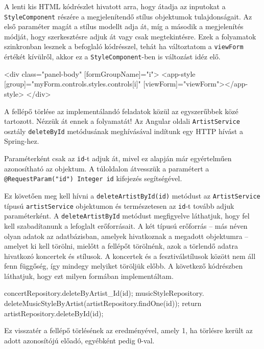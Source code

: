 A lenti kis HTML kódrészlet hivatott arra, hogy átadja az inputokat a \texttt{StyleComponent} részére a megjelenítendő stílus objektumok tulajdonságait. Az első paraméter magát a stílus modellt adja át, míg a második a megjelenítés módját, hogy szerkesztésre adjuk át vagy csak megtekintésre. Ezek a folyamatok szinkronban lesznek a befoglaló kódrésszel, tehát ha változtatom a \texttt{viewForm} értékét kívülről, akkor ez a \texttt{StyleComponent}-ben is változást idéz elő.
\begin{java}
<div class="panel-body" [formGroupName]="i">
     <app-style [group]="myForm.controls.styles.controls[i]"
     [viewForm]="viewForm"></app-style>
</div>
\end{java}


A fellépő törlése az implementálandó feladatok közül az egyszerűbbek közé tartozott. Nézzük át ennek a folyamatát! Az Angular oldali \texttt{ArtistService} osztály \texttt{deleteById} metódusának meghívásával indítunk egy HTTP hívást a Spring-hez.


Paraméterként csak az \texttt{id}-t adjuk át, mivel ez alapján már egyértelműen azonosítható az objektum. A túloldalon átvesszük a paramétert a \texttt{@RequestParam("id") Integer id} kifejezés segítségével.

Ez követően meg kell hívni a \texttt{deleteArtistById(id)} metódust az \texttt{ArtistService} típusú \texttt{artistService} objektumon és természetesen az \texttt{id}-t tovább adjuk paraméterként. A \texttt{deleteArtistById} metódust megfigyelve láthatjuk, hogy fel kell szabadítanunk a lefoglalt erőforrásait. A két típusú erőforrás -- más néven olyan adatok az adatbázisban, amelyek hivatkoznak a megadott objektumra -- amelyet ki kell törölni, mielőtt a fellépőt törölnénk, azok a törlendő adatra hivatkozó koncertek és stílusok. A koncertek és a fesztiválstílusok között nem áll fenn függőség, így mindegy melyiket töröljük előbb. A következő kódrészben láthatjuk, hogy ezt milyen formában implementáltam.
\begin{java}
concertRepository.deleteByArtist_Id(id);
musicStyleRepository.
deleteMusicStyleByArtist(artistRepository.findOne(id));
return artistRepository.deleteById(id);
\end{java}
Ez visszatér a fellépő törlésének az eredményével, amely 1, ha törlésre került az adott azonosítójú előadó, egyébként pedig 0-val.

